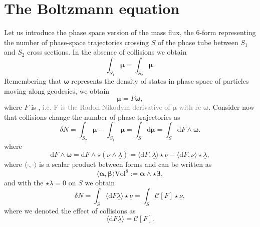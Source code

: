 \section{The Boltzmann equation}

Let us introduce the phase space version of the mass flux, the $6$-form representing 
the number of phase-space trajectories crossing $S$ of the phase tube between $S_1$ and $S_2$ cross sections. 
In the absence of collisions we obtain 
%
\begin{equation}
\int_{S_1}\boldsymbol{\mu} = \int_{S_2}\boldsymbol{\mu}.
\end{equation}
%
Remembering that $\boldsymbol{\omega}$ represents the density of states in phase 
space of particles moving along geodesics, we obtain 
%
\begin{equation}
\boldsymbol{\mu} = F\boldsymbol{\omega},
\end{equation}
%
where $F$ is , 
\textcolor{gray}{i.e. F is the Radon-Nikodym derivative of $\boldsymbol{\mu}$ with re $\boldsymbol{\omega}$}. 
%
Consider now that collisions change the number of phase trajectories as 
%
\begin{equation}
\delta N = \int_{S_2} \boldsymbol{\mu} - \int_{S_1}\boldsymbol{\mu} = \int_S \text{d}\boldsymbol{\mu} = \int_S \text{d}F\wedge\boldsymbol{\omega}.
\end{equation}
%
where 
%
\begin{equation}
\text{d}F\wedge\boldsymbol{\omega} = \text{d}F\wedge\star (\underline{\nu}\wedge\underline{\lambda}) = \langle\text{d}F,\underline{\lambda}\rangle\star\underline{\nu} - \langle\text{d}F,\underline{\nu}\rangle\star\underline{\lambda},
\end{equation}
%
where $\langle\cdot,\cdot\rangle$ is a scalar product between forms and can be written as
%
\begin{equation}
\langle\boldsymbol{\alpha},\boldsymbol{\beta}\rangle\text{Vol}^8 := \boldsymbol{\alpha}\wedge\star\boldsymbol{\beta},
\end{equation}
%
and with the $\star\underline{\lambda}=0$ on $S$ we obtain 
%
\begin{equation}
\delta N = \int_S\langle\text{d}F\underline{\lambda}\rangle\star\underline{\nu} = \int_S\mathcal{C}[F]\star\underline{\nu},
\end{equation}
%
where we denoted the effect of collisions as
%
\begin{equation}
\langle\text{d}F\underline{\lambda}\rangle = \mathcal{C}[F].
\end{equation}
